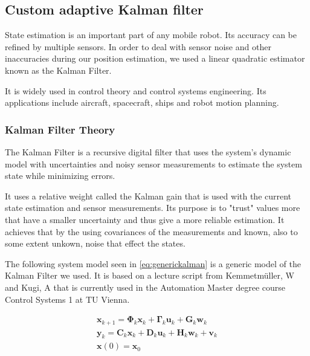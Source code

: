 \documentclass[class=article, crop=false]{standalone}
\begin{document}
\subsection{Custom adaptive Kalman filter}\label{subsec:customkalman}
State estimation is an important part of any mobile robot. Its accuracy can be refined by multiple sensors. In order to deal with sensor noise and other inaccuracies during our position estimation, we used a linear quadratic estimator known as the Kalman Filter.

It is widely used in control theory and control systems engineering. Its applications include aircraft, spacecraft, ships and robot motion planning.

\subsubsection{Kalman Filter Theory}\label{subsubsec:kalmanfilter}

The Kalman Filter is a recursive digital filter that uses the system's dynamic model with uncertainties and noisy sensor measurements to estimate the system state while minimizing errors.

It uses a relative weight called the Kalman gain that is used with the current state estimation and sensor measurements. Its purpose is to "trust" values more that have a smaller uncertainty and thus give a more reliable estimation. It achieves that by the using covariances of the measurements and known, also to some extent unkown, noise that effect the states.

The following system model seen in \eqref{eq:generickalman} is a generic model of the Kalman Filter we used. It is based on a lecture script from Kemmetm{\"u}ller, W and Kugi, A\cite{regelungssysteme1} that is currently used in the Automation Master degree course Control Systems 1 at TU Vienna.

\begin{equation}
\begin{gathered}
  \textbf{x}_{k+1} =
  \boldsymbol{\Phi}_k
  \textbf{x}_k +
  \boldsymbol{\Gamma}_k
  \textbf{u}_k +
  \textbf{G}_k
  \textbf{w}_k \\
  \textbf{y}_k =
  \textbf{C}_k
  \textbf{x}_k +
  \textbf{D}_k
  \textbf{u}_k +
  \textbf{H}_k
  \textbf{w}_k +
  \textbf{v}_k \\
  \textbf{x}(0) = \textbf{x}_0 \\
\end{gathered}\label{eq:generickalman}
\end{equation}
\end{document}

